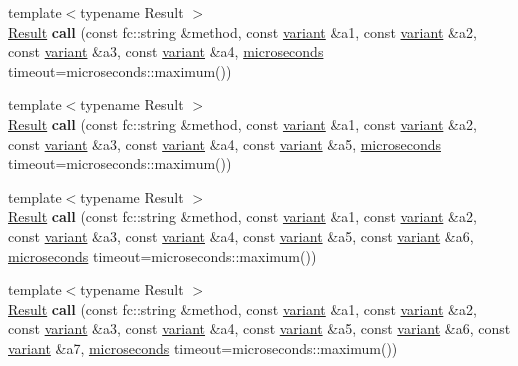 \begin{Indent}
\begin{DoxyCompactItemize}
\item 
\mbox{\label{classfc_1_1rpc_1_1json__connection_aa8c48fe5ccbde957bfb1c71967024489}} 
{\footnotesize template$<$typename Result $>$ }\\\mbox{\hyperlink{struct_result}{Result}} {\bfseries call} (const fc\+::string \&method, const \mbox{\hyperlink{classfc_1_1variant}{variant}} \&a1, const \mbox{\hyperlink{classfc_1_1variant}{variant}} \&a2, const \mbox{\hyperlink{classfc_1_1variant}{variant}} \&a3, const \mbox{\hyperlink{classfc_1_1variant}{variant}} \&a4, \mbox{\hyperlink{classfc_1_1microseconds}{microseconds}} timeout=microseconds\+::maximum())
\item 
\mbox{\label{classfc_1_1rpc_1_1json__connection_ae51b3707c50801d33e515396c6fb9100}} 
{\footnotesize template$<$typename Result $>$ }\\\mbox{\hyperlink{struct_result}{Result}} {\bfseries call} (const fc\+::string \&method, const \mbox{\hyperlink{classfc_1_1variant}{variant}} \&a1, const \mbox{\hyperlink{classfc_1_1variant}{variant}} \&a2, const \mbox{\hyperlink{classfc_1_1variant}{variant}} \&a3, const \mbox{\hyperlink{classfc_1_1variant}{variant}} \&a4, const \mbox{\hyperlink{classfc_1_1variant}{variant}} \&a5, \mbox{\hyperlink{classfc_1_1microseconds}{microseconds}} timeout=microseconds\+::maximum())
\item 
\mbox{\label{classfc_1_1rpc_1_1json__connection_a0e4452c7fd3a63a2a3cf2367b30104f9}} 
{\footnotesize template$<$typename Result $>$ }\\\mbox{\hyperlink{struct_result}{Result}} {\bfseries call} (const fc\+::string \&method, const \mbox{\hyperlink{classfc_1_1variant}{variant}} \&a1, const \mbox{\hyperlink{classfc_1_1variant}{variant}} \&a2, const \mbox{\hyperlink{classfc_1_1variant}{variant}} \&a3, const \mbox{\hyperlink{classfc_1_1variant}{variant}} \&a4, const \mbox{\hyperlink{classfc_1_1variant}{variant}} \&a5, const \mbox{\hyperlink{classfc_1_1variant}{variant}} \&a6, \mbox{\hyperlink{classfc_1_1microseconds}{microseconds}} timeout=microseconds\+::maximum())
\item 
\mbox{\label{classfc_1_1rpc_1_1json__connection_a0cd21fa03ad53d18da1024e115a7e321}} 
{\footnotesize template$<$typename Result $>$ }\\\mbox{\hyperlink{struct_result}{Result}} {\bfseries call} (const fc\+::string \&method, const \mbox{\hyperlink{classfc_1_1variant}{variant}} \&a1, const \mbox{\hyperlink{classfc_1_1variant}{variant}} \&a2, const \mbox{\hyperlink{classfc_1_1variant}{variant}} \&a3, const \mbox{\hyperlink{classfc_1_1variant}{variant}} \&a4, const \mbox{\hyperlink{classfc_1_1variant}{variant}} \&a5, const \mbox{\hyperlink{classfc_1_1variant}{variant}} \&a6, const \mbox{\hyperlink{classfc_1_1variant}{variant}} \&a7, \mbox{\hyperlink{classfc_1_1microseconds}{microseconds}} timeout=microseconds\+::maximum())

\end{DoxyCompactItemize}
\end{Indent}
